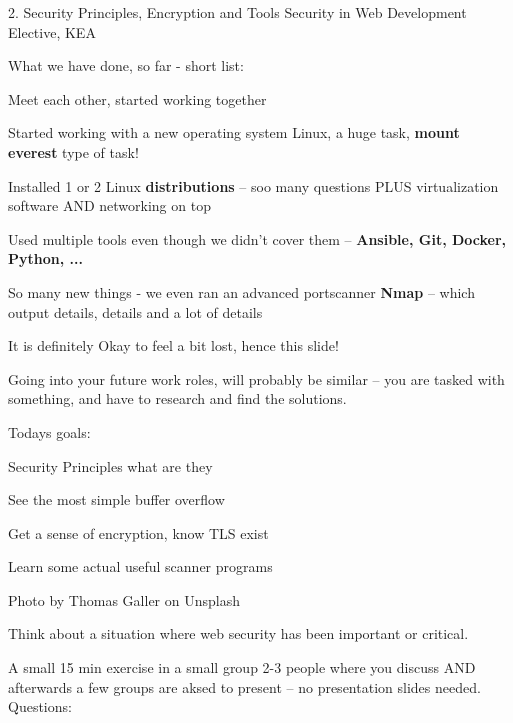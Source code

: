 \documentclass[Screen16to9,17pt]{foils}
\begin{document}
\mytitlepage
{2. Security Principles, Encryption and Tools}
{Security in Web Development Elective, KEA}



What we have done, so far - short list:
\begin{list2}
\item Meet each other, started working together
\item Started working with a new operating system Linux, a huge task, {\bf mount everest} type of task!
\item Installed 1 or 2 Linux {\bf distributions} -- soo many questions PLUS virtualization software AND networking on top
\item Used multiple tools even though we didn't cover them -- {\bf Ansible, Git, Docker, Python, ...}
\item So many new things - we even ran an advanced portscanner {\bf Nmap} -- which output details, details and a lot of details
\end{list2}

\vskip 6mm
\centerline{\Large It is definitely Okay to feel a bit lost, hence this slide!}

\vskip 6mm
Going into your future work roles, will probably be similar -- you are tasked with something, and have to research and find the solutions.



Todays goals:
\begin{list2}
\item Security Principles what are they
\item See the most simple buffer overflow
\item Get a sense of encryption, know TLS exist
\item Learn some actual useful scanner programs
\end{list2}

{\small   Photo by Thomas Galler on Unsplash}


Think about a situation where web security has been important or critical.

A small 15 min exercise in a small group 2-3 people where you discuss AND afterwards a few groups are aksed to present -- no presentation slides needed.\\
Questions:
\end{document}
